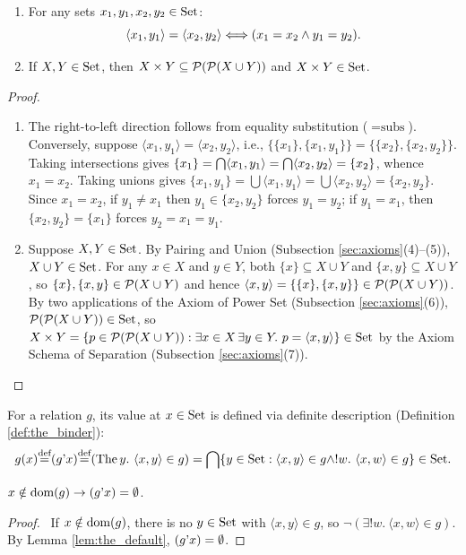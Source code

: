\documentclass[10pt,a4paper]{article}
\renewcommand{\myprf}{\begin{proof}}
\renewcommand{\myqed}{\end{proof}}
\begin{document}
\begin{lemma}\label{lem:pair_prop}
\begin{enumerate}
\item For any sets $x_1, y_1, x_2, y_2 \in {\textrm{Set}}$:
$$\langle x_1, y_1 \rangle = \langle x_2, y_2 \rangle \Longleftrightarrow (x_1 = x_2 \land y_1 = y_2).$$
\item If $X, Y \in {\textrm{Set}}$, then $X \times Y \subseteq {\mathcal{P}}({\mathcal{P}}(X \cup Y))$ and $X \times Y \in {\textrm{Set}}$.
\end{enumerate}
\end{lemma}
\myprf
\begin{enumerate}
\item The right-to-left direction follows from equality substitution ($=\textrm{subs}$). Conversely, suppose $\langle x_1, y_1 \rangle = \langle x_2, y_2 \rangle$, i.e., $\{\{x_1\}, \{x_1, y_1\}\} = \{\{x_2\}, \{x_2, y_2\}\}$. Taking intersections gives $\{x_1\} = {\bigcap} \langle x_1, y_1 \rangle = {\bigcap} \langle x_2, y_2 \rangle = \{x_2\}$, whence $x_1 = x_2$. Taking unions gives $\{x_1, y_1\} = \bigcup \langle x_1, y_1 \rangle = \bigcup \langle x_2, y_2 \rangle = \{x_2, y_2\}$. Since $x_1 = x_2$, if $y_1 \neq x_1$ then $y_1 \in \{x_2, y_2\}$ forces $y_1 = y_2$; if $y_1 = x_1$, then $\{x_2, y_2\} = \{x_1\}$ forces $y_2 = x_1 = y_1$.
\item Suppose $X, Y \in {\textrm{Set}}$. By Pairing and Union (Subsection \ref{sec:axioms}(4)--(5)), $X \cup Y \in {\textrm{Set}}$. For any $x \in X$ and $y \in Y$, both $\{x\} \subseteq X \cup Y$ and $\{x, y\} \subseteq X \cup Y$, so $\{x\}, \{x, y\} \in {\mathcal{P}}(X \cup Y)$ and hence $\langle x, y \rangle = \{\{x\}, \{x, y\}\} \in {\mathcal{P}}({\mathcal{P}}(X \cup Y))$. By two applications of the Axiom of Power Set (Subsection \ref{sec:axioms}(6)), ${\mathcal{P}}({\mathcal{P}}(X \cup Y)) \in {\textrm{Set}}$, so $X \times Y = \{p \in {\mathcal{P}}({\mathcal{P}}(X \cup Y)) : \exists x \in X\, \exists y \in Y.\ p = \langle x, y \rangle\} \in {\textrm{Set}}$ by the Axiom Schema of Separation (Subsection \ref{sec:axioms}(7)).
\end{enumerate}
\myqed

For a relation $g$, its value at $x \in {\textrm{Set}}$ is defined via definite description (Definition \ref{def:the_binder}):
$$g(x) {\stackrel{{\textrm{def}}}{=}} (g{\textrm{'}} x) {\stackrel{{\textrm{def}}}{=}} ({\textrm{The\,}} y.\ \langle x, y\rangle \in g) = {\bigcap} \{y \in {\textrm{Set}} : \langle x,y\rangle \in g \land !w.\ \langle x,w\rangle \in g\} \in {\textrm{Set}}.$$

\begin{exercise}
$x\notin {\textrm{dom}}(g)\to (g{\textrm{'}} x)=\emptyset$.
\end{exercise}
\myprf\ If $x \notin {\textrm{dom}}(g)$, there is no $y \in {\textrm{Set}}$ with $\langle x,y\rangle \in g$, so $\neg(\exists !w.\ \langle x,w\rangle \in g)$. By Lemma \ref{lem:the_default}, $(g{\textrm{'}} x) = \emptyset$. \myqed
\end{document}
